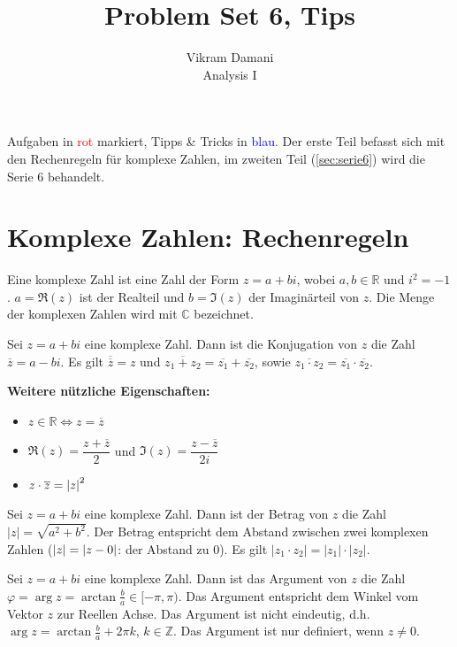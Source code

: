 \documentclass[12pt]{article}
\newcommand{\R}{\mathbb{R}} %
\newcommand{\Z}{\mathbb{Z}}
\newcommand{\C}{\mathbb{C}}
\newenvironment{definition}[2][Definition]{\begin{trivlist}
        \item[\hskip \labelsep {\bfseries #1}\hskip \labelsep {\bfseries #2.}]}{\flushright{$\square$}\end{trivlist}}
\begin{document}
\title{Problem Set 6, Tips}
\author{Vikram Damani\\
        Analysis I}

\maketitle
Aufgaben in \textcolor{red}{rot} markiert, Tipps \& Tricks in \textcolor{blue}{blau}. Der erste Teil befasst sich mit den Rechenregeln für komplexe Zahlen, im zweiten Teil (\ref{sec:serie6}) wird die Serie 6 behandelt.

\section{Komplexe Zahlen: Rechenregeln}
\begin{definition}{[Komplexe Zahl]}
        Eine komplexe Zahl ist eine Zahl der Form $z=a+bi$, wobei $a,b\in\R$ und $i^2=-1$. $a=\Re{(z)}$ ist der Realteil und $b=\Im{(z)}$ der Imaginärteil von $z$. Die Menge der komplexen Zahlen wird mit $\C$ bezeichnet.
\end{definition}

\begin{definition}{[Konjugation]}
        Sei $z=a+bi$ eine komplexe Zahl. Dann ist die Konjugation von $z$ die Zahl $\overline{z}=a-bi$. Es gilt $\overline{\overline{z}}=z$ und $\overline{z_1+z_2}=\overline{z_1}+\overline{z_2}$, sowie $\overline{z_1\cdot z_2}=\overline{z_1}\cdot\overline{z_2}$.

        \textbf{Weitere nützliche Eigenschaften:}
        \begin{itemize}
                \item $z\in\R\iff z=\overline{z}$
                \item $\Re{(z)}=\dfrac{z+\overline{z}}{2}$ und $\Im{(z)}=\dfrac{z-\overline{z}}{2i}$
                \item  $z\cdot\overline{z}=\abs{z}^2$
        \end{itemize}
\end{definition}

\begin{definition}{[Betrag]}
        Sei $z=a+bi$ eine komplexe Zahl. Dann ist der Betrag von $z$ die Zahl $|z|=\sqrt{a^2+b^2}$. Der Betrag entspricht dem Abstand zwischen zwei komplexen Zahlen ($\abs{z} =\abs{z-0}$: der Abstand zu $0$). Es gilt $|z_1\cdot z_2|=|z_1|\cdot|z_2|$.
\end{definition}

\begin{definition}{[Argument]}
        Sei $z=a+bi$ eine komplexe Zahl. Dann ist das Argument von $z$ die Zahl $\varphi=\arg{z}=\arctan{\frac{b}{a}}\in[-\pi,\pi)$. Das Argument entspricht dem Winkel vom Vektor $z$ zur Reellen Achse. Das Argument ist nicht eindeutig, d.h. $\arg{z}=\arctan{\frac{b}{a}}+2\pi k$, $k\in\Z$. Das Argument ist nur definiert, wenn $z\neq 0$.
\end{definition}
\end{document}
